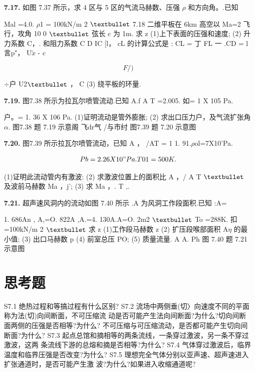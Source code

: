 \noindent\textbf{7.17.} 如图 7.37 所示，求 4 区与 5 区的气流马赫数、压强 $\rho$ 和方向角。.已知

Mal =4.0. $\rho$1 = 100kN/m 2 ${\rm •}$ 7.18 二维平板在 6km 高空以 Ma=2 飞行，攻角 10 0 ${\rm •}$ 弦长 c 为 1m. 求 z (1)上下表面的压强和速度; (2) 升力系数 C，. 和阻力系数 C D IC [l， cL 的计算公式是 : CL = 丁 FL 一 .CD = l 言p"， U$\tilde{x}$ - c

\[F/)\]

$\div$户 U2${\rm •}$ ， C (3) 绕平板的环量.

\noindent\textbf{7.19.} 图7.38 所示为拉瓦尔喷管流动.已知 A.f A T =2.005. 如= 1 X 105 Pa.

户。= 1. 36 X 106 Pa. (1)证明流动是管外膨胀; (2) 求出口压力户，及气流扩张角 $\alpha$. 图7.38 题 7.19 示意阁 飞dr气 /与市纣 图7.39 题 7.20 示意图

\noindent\textbf{7.20.} 图7.39 所示拉瓦尔喷管流动，已知 A ， /AT = 1 1. 91.$\rho$ol=7X10'Pa.

\[Pb=2. 26X 10"Pa. T 01 =500K.\]

(1)证明此流动管内有激波: (2) 求激波位置上的面积比 A ，/ A T ${\rm •}$ 及波前马赫数 Ma ，j'; (3) 求 Ma ，. T ,.

\noindent\textbf{7.21.} 超声速风洞内的流动如图 7.40 所示 .A 为风洞工作段面积.已知 :A=

1. 686An , A,=O. 822A ,A.=4. 130A.A=O. 2m2 ${\rm •}$ To =288K. 扣 =100kN/m 2 ${\rm •}$ 求 z (1)工作段马赫数 z (2) 扩压段喉部面积 A$\eta$ 的最小值; (3) 出口马赫数 p (4) 前室总压 PO; (5) 质量流量. A A. Ph 图 7.40 题 7.21 示意图

\section*{思考题}

S7.1 绝热过程和等搞过程有什么区别? S7.2 流场中两侧垂(切〉向速度不同的平面称为法(切)向间断面，不可压缩流 动是否可能产生法向间断面?为什么?切向间断面两侧的压强是否相等?为什么? 不可压缩与可压缩流动，是否都可能产生切向间断面?为什么? S7.3 起点总馆和摘相等的两条流线，一条穿过激波，另一条不穿过激波，这两 条流线下游的总熔和摘是否相等?为什么? S7.4 气体穿过激波后，临界温度和临界压强是否改变?为什么? S7.5 理想完全气体分别以亚声速、超声速进入扩张通道时，是否可能产生激 波?为什么?如果进入收缩通道呢?
